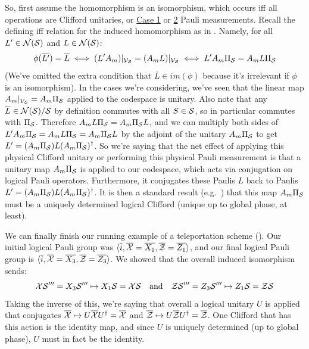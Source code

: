 So, first assume the homomorphism is an isomorphism, which occurs iff all operations are Clifford unitaries, or \hyperref[thm:stabilizer_group_update_measurement:case1]{Case 1} or \hyperref[thm:stabilizer_group_update_measurement:case2]{2} Pauli measurements.
Recall the defining iff relation for the induced homomorphism as in .
Namely, for all $L' \in \mathcal{N}(\mathcal{S})$ and $L \in \mathcal{N}(\mathcal{S})$:
\begin{equation}
    \phi(\overline{L'}) = \overline{L}
    \iff (L' A_m)|_{\mathcal{V}_{\mathcal{S}}} = (A_m L)|_{\mathcal{V}_{\mathcal{S}}}
    \iff L' A_m \Pi_{\mathcal{S}} = A_m L \Pi_{\mathcal{S}}
\end{equation}
(We've omitted the extra condition that $\overline{L} \in im(\phi)$ because it's irrelevant if $\phi$ is an isomorphism).
In the cases we're considering, we've seen that the linear map $A_m|_{\mathcal{V}_{\mathcal{S}}} = A_m \Pi_{\mathcal{S}}$ applied to the codespace is unitary.
Also note that any $\overline{L} \in \mathcal{N}(\mathcal{S})/\mathcal{S}$ by definition commutes with all $S \in \mathcal{S}$, so in particular commutes with $\Pi_{\mathcal{S}}$.
Therefore $A_m L \Pi_{\mathcal{S}} = A_m \Pi_{\mathcal{S}} L$, and we can multiply both sides of $L' A_m \Pi_{\mathcal{S}} = A_m L \Pi_{\mathcal{S}} = A_m \Pi_{\mathcal{S}} L$ by the adjoint of the unitary $A_m \Pi_{\mathcal{S}}$ to get $L' = (A_m \Pi_{\mathcal{S}}) L (A_m \Pi_{\mathcal{S}})^\dagger$.
So we're saying that the net effect of applying this physical Clifford unitary or performing this physical Pauli measurement is that a unitary map $A_m \Pi_{\mathcal{S}}$ is applied to our codespace, which acts via conjugation on logical Pauli operators.
Furthermore, it conjugates these Paulis $L$ back to Paulis $L' = (A_m \Pi_{\mathcal{S}}) L (A_m \Pi_{\mathcal{S}})^\dagger$.
It is then a standard result (e.g.\ ) that this map $A_m \Pi_{\mathcal{S}}$ must be a uniquely determined logical Clifford (unique up to global phase, at least).

\begin{example}\label{ex:teleportation_logical_clifford}
    We can finally finish our running example of a teleportation scheme ().
    Our initial logical Pauli group was $\langle \overline{i}, \overline{\mathcal{X}} = \overline{X_1}, \overline{\mathcal{Z}} = \overline{Z_1} \rangle$, and our final logical Pauli group is $\langle \overline{i}, \overline{\mathcal{X}} = \overline{X_3}, \overline{\mathcal{Z}} = \overline{Z_3} \rangle$.
    We showed that the overall induced isomorphism sends:
    \begin{equation}
        \mathcal{X}\mathcal{S}''' = X_3\mathcal{S}''' \mapsto X_1\mathcal{S} = \mathcal{X}\mathcal{S}
        \quad\text{and}\quad
        \mathcal{Z}\mathcal{S}''' = Z_3\mathcal{S}''' \mapsto Z_1\mathcal{S} = \mathcal{Z}\mathcal{S}
    \end{equation}
    Taking the inverse of this, we're saying that overall a logical unitary $U$ is applied that conjugates $\overline{\mathcal{X}} \mapsto U\overline{\mathcal{X}} U^\dagger = \overline{\mathcal{X}}$ and $\overline{\mathcal{Z}} \mapsto U\overline{\mathcal{Z}} U^\dagger = \overline{\mathcal{Z}}$.
    One Clifford that has this action is the identity map, and since $U$ is uniquely determined (up to global phase), $U$ must in fact be the identity.
\end{example}

